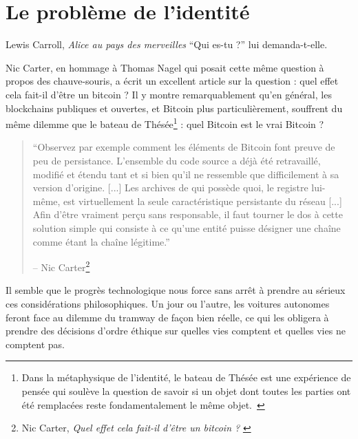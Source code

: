 \chapter{Le problème de l'identité}
\label{les:4}

\begin{chapquote}{Lewis Carroll, \textit{Alice au pays des merveilles}}
  \enquote{Qui es-tu ?} lui demanda-t-elle.
\end{chapquote}

Nic Carter, en hommage à Thomas Nagel qui posait cette même question à propos
des chauve-souris, a écrit un excellent article sur la question : quel effet
cela fait-il d'être un bitcoin ? Il y montre remarquablement qu'en général, les
blockchains publiques et ouvertes, et Bitcoin plus particulièrement, souffrent
du même dilemme que le bateau de Thésée\footnote{Dans la métaphysique de
l'identité, le bateau de Thésée est une expérience de pensée qui soulève la
question de savoir si un objet dont toutes les parties ont été remplacées reste
fondamentalement le même objet.~\cite{wiki:theseus}} : quel Bitcoin est le vrai
Bitcoin ?

\begin{quotation}\begin{samepage}
\enquote{Observez par exemple comment les éléments de Bitcoin font preuve de peu
de persistance. L'ensemble du code source a déjà été retravaillé, modifié et
étendu tant et si bien qu'il ne ressemble que difficilement à sa version
d'origine. [...] Les archives de qui possède quoi, le registre lui-même, est
virtuellement la seule caractéristique persistante du réseau [...]
Afin d'être vraiment perçu sans responsable, il faut tourner le dos à cette
solution simple qui consiste à ce qu'une entité puisse désigner une chaîne comme
étant la chaîne légitime.}
\begin{flushright} -- Nic Carter\footnote{Nic Carter, \textit{Quel effet cela
fait-il d'être un bitcoin ?} \cite{bitcoin-identity}}
\end{flushright}\end{samepage}\end{quotation}

Il semble que le progrès technologique nous force sans arrêt à prendre au
sérieux ces considérations philosophiques. Un jour ou l'autre, les voitures
autonomes feront face au dilemme du tramway de façon bien réelle, ce qui les
obligera à prendre des décisions d'ordre éthique sur quelles vies comptent et
quelles vies ne comptent pas.

